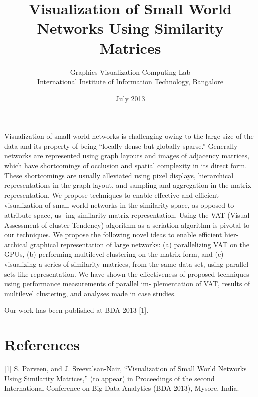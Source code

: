 \documentclass{article}
\title{Visualization of Small World Networks Using Similarity Matrices}
\author{Graphics-Visualization-Computing Lab \\
International Institute of Information Technology, Bangalore}
\date{July 2013}
\begin{document}
\maketitle

Visualization of small world networks is challenging owing
to the large size of the data and its property of being ``locally dense but
globally sparse.'' Generally networks are represented using graph layouts
and images of adjacency matrices, which have shortcomings of occlusion
and spatial complexity in its direct form. These shortcomings are usually
alleviated using pixel displays, hierarchical representations in the graph
layout, and sampling and aggregation in the matrix representation. We
propose techniques to enable effective and efficient visualization of small
world networks in the similarity space, as opposed to attribute space, us-
ing similarity matrix representation. Using the VAT (Visual Assessment
of cluster Tendency) algorithm as a seriation algorithm is pivotal to our
techniques. We propose the following novel ideas to enable efficient hier-
archical graphical representation of large networks: (a) parallelizing VAT
on the GPUs, (b) performing multilevel clustering on the matrix form,
and (c) visualizing a series of similarity matrices, from the same data set,
using parallel sets-like representation. We have shown the effectiveness
of proposed techniques using performance measurements of parallel im-
plementation of VAT, results of multilevel clustering, and analyses made
in case studies.

Our work has been published at BDA 2013 [1].

\section*{References}
[1] S. Parveen, and J. Sreevalsan-Nair, ``Visualization of Small World Networks Using Similarity Matrices,'' (to appear) in Proceedings of the second International Conference on Big Data Analytics (BDA 2013), Mysore, India.
\end{document}
